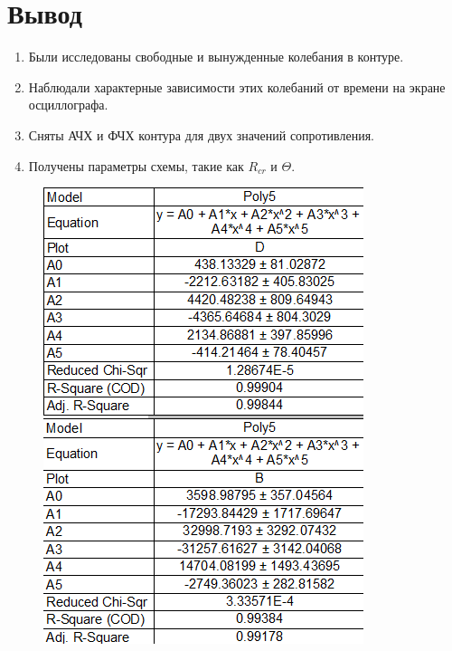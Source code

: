 \documentclass[a4paper, 12pt]{article}
\begin{document}
\section{ Вывод}
\begin{enumerate}
    \item Были исследованы свободные и вынужденные колебания в контуре.
    \item Наблюдали характерные зависимости этих колебаний от времени на экране осциллографа.
    \item Сняты АЧХ и ФЧХ контура для двух значений сопротивления.
    \item Получены параметры схемы, такие как $R_{cr}$ и $\Theta$.
\end{enumerate}
\newpage
\begin{figure}[H]
	\begin{center}
	\includegraphics[width=\textwidth]{G6.png}
	\end{center}
	\end{figure}
\end{document}
